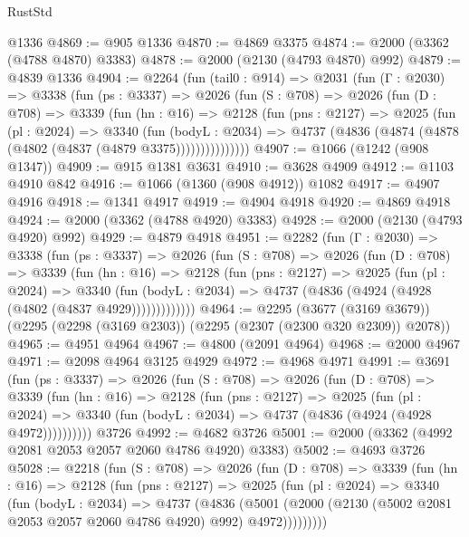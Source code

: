 \begin{lexlean}{RustStd}
\begin{coremodule}
    @1336
@4869 := @905 @1336
@4870 := @4869 @3375
@4874 := @2000 (@3362 (@4788 @4870) @3383)
@4878 := @2000 (@2130 (@4793 @4870) @992)
@4879 := @4839 @1336
@4904 := @2264
    (fun (tail0 : @914) =>
    @2031
      (fun (Γ : @2030) =>
      @3338
        (fun (ps : @3337) =>
        @2026
          (fun (S : @708) =>
          @2026
            (fun (D : @708) =>
            @3339
              (fun (hn : @16) =>
              @2128
                (fun (pns : @2127) =>
                @2025
                  (fun (pl : @2024) =>
                  @3340
                    (fun (bodyL : @2034) =>
                    @4737 (@4836 (@4874 (@4878 (@4802 (@4837 (@4879 @3375)))))))))))))))
@4907 := @1066 (@1242 (@908 @1347))
@4909 := @915 @1381 @3631
@4910 := @3628 @4909
@4912 := @1103 @4910 @842
@4916 := @1066 (@1360 (@908 @4912)) @1082
@4917 := @4907 @4916
@4918 := @1341 @4917
@4919 := @4904 @4918
@4920 := @4869 @4918
@4924 := @2000 (@3362 (@4788 @4920) @3383)
@4928 := @2000 (@2130 (@4793 @4920) @992)
@4929 := @4879 @4918
@4951 := @2282
    (fun (Γ : @2030) =>
    @3338
      (fun (ps : @3337) =>
      @2026
        (fun (S : @708) =>
        @2026
          (fun (D : @708) =>
          @3339
            (fun (hn : @16) =>
            @2128
              (fun (pns : @2127) =>
              @2025
                (fun (pl : @2024) =>
                @3340
                  (fun (bodyL : @2034) =>
                  @4737 (@4836 (@4924 (@4928 (@4802 (@4837 @4929)))))))))))))
@4964 := @2295
    (@3677 (@3169 @3679))
    (@2295 (@2298 (@3169 @2303)) (@2295 (@2307 (@2300 @320 @2309)) @2078))
@4965 := @4951 @4964
@4967 := @4800 (@2091 @4964)
@4968 := @2000 @4967
@4971 := @2098 @4964 @3125 @4929
@4972 := @4968 @4971
@4991 := @3691
    (fun (ps : @3337) =>
    @2026
      (fun (S : @708) =>
      @2026
        (fun (D : @708) =>
        @3339
          (fun (hn : @16) =>
          @2128
            (fun (pns : @2127) =>
            @2025
              (fun (pl : @2024) =>
              @3340 (fun (bodyL : @2034) => @4737 (@4836 (@4924 (@4928 @4972))))))))))
    @3726
@4992 := @4682 @3726
@5001 := @2000 (@3362 (@4992 @2081 @2053 @2057 @2060 @4786 @4920) @3383)
@5002 := @4693 @3726
@5028 := @2218
    (fun (S : @708) =>
    @2026
      (fun (D : @708) =>
      @3339
        (fun (hn : @16) =>
        @2128
          (fun (pns : @2127) =>
          @2025
            (fun (pl : @2024) =>
            @3340
              (fun (bodyL : @2034) =>
              @4737
                (@4836
                  (@5001
                    (@2000 (@2130 (@5002 @2081 @2053 @2057 @2060 @4786 @4920) @992) @4972)))))))))

\end{coremodule}
\end{lexlean}
